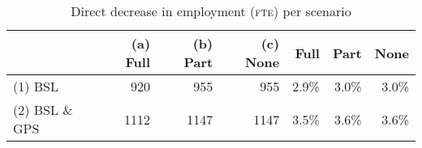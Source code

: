 \begin{table}[H]
\centering
\caption{\label{comjldex} Direct decrease in employment (\textsc{fte}) per scenario} 
\begin{tabular}{lrrr|rrr}
  \hline
 &  (a) Full & (b) Part & (c) None & Full & Part & None \\ 
  \hline
(1) BSL & 920 & 955 & 955 & 2.9\% & 3.0\% & 3.0\% \\ 
  (2) BSL \& GPS & 1112 & 1147 & 1147 & 3.5\% & 3.6\% & 3.6\% \\ 
   \hline
\end{tabular}
\end{table}

